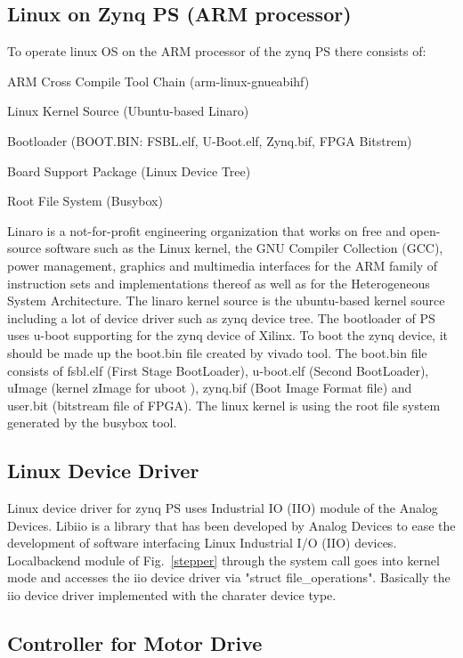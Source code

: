 \documentclass[a4paper,
              ]{jacow}
\begin{document}
\subsection{Linux on Zynq PS (ARM processor)}
To operate linux OS on the ARM processor of the zynq PS there consists of:
\begin{Itemize}
	\item ARM Cross Compile Tool Chain (arm-linux-gnueabihf)
	\item Linux Kernel Source (Ubuntu-based Linaro)
	\item Bootloader (BOOT.BIN: FSBL.elf, U-Boot.elf, Zynq.bif, FPGA Bitstrem)
	\item Board Support Package (Linux Device Tree)
	\item Root File System (Busybox)
\end{Itemize}
Linaro is a not-for-profit engineering organization that works on free and open-source software such as the Linux kernel, the GNU Compiler Collection (GCC), power management, graphics and multimedia interfaces for the ARM family of instruction sets and implementations thereof as well as for the Heterogeneous System Architecture\cite{linaro}.   
The linaro kernel source is the ubuntu-based kernel source including a lot of device driver such as zynq device tree.
The bootloader of PS uses u-boot\cite{u-boot} supporting for the zynq device of Xilinx. To boot the zynq device, it should be made up the boot.bin file created by vivado\cite{vivado} tool. The boot.bin\cite{boot-bin} file consists of fsbl.elf (First Stage BootLoader), u-boot.elf (Second BootLoader), uImage (kernel zImage for uboot ), zynq.bif (Boot Image Format file) and user.bit (bitstream file of FPGA). The linux kernel is using the root file system generated by the busybox\cite{busybox} tool.

\subsection{Linux Device Driver}
Linux device driver for zynq PS uses Industrial IO (IIO) module of the Analog Devices. Libiio\cite{iio} is a library that has been developed by Analog Devices to ease the development of software interfacing Linux Industrial I/O (IIO) devices. Localbackend module of Fig.~\ref{stepper} through the system call goes into kernel mode and accesses the iio device driver via "struct file\_operations". Basically the iio device driver implemented with the charater device type.

\subsection{Controller for Motor Drive}
\end{document}
